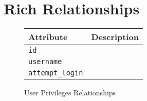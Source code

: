 \section{Rich Relationships}

\begin{figure}[htb]
\begin{center}
\begin{tabular}{ | l | p{8cm} | }
  \hline
    \textbf{Attribute} & \textbf{Description} \\ \hline
    \verb+id+ & \\ \hline
    \verb+username+ & \\ \hline
    \verb+attempt_login+ & \\ \hline
\end{tabular}
\caption{User Privileges Relationships}
\label{tab:user_privileges_relationships}
\end{center}
\end{figure}